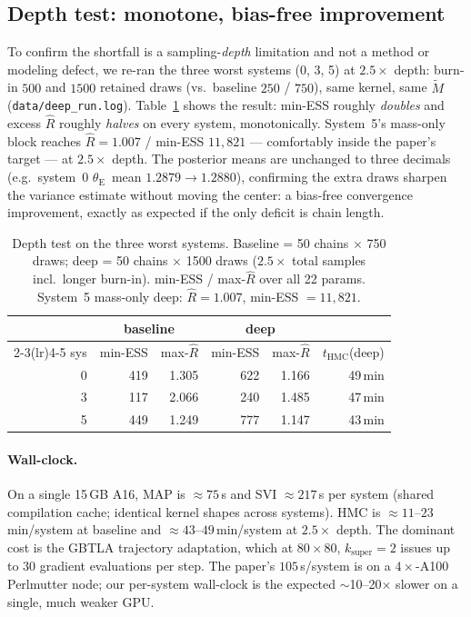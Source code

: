 \documentclass[11pt,letterpaper]{article}
\newcommand{\thetaE}{\ensuremath{\theta_{\mathrm{E}}}}
\newcommand{\Rhat}{\ensuremath{\hat{R}}}
\begin{document}
\subsection{Depth test: monotone, bias-free improvement}

To confirm the shortfall is a sampling-\emph{depth} limitation and not a
method or modeling defect, we re-ran the three worst systems (0, 3, 5) at
$2.5\times$ depth: burn-in $500$ and $1500$ retained draws (vs.\ baseline
$250$ / $750$), same kernel, same $\tilde{M}$
(\texttt{data/deep\_run.log}). Table~\ref{tab:depth} shows the result:
min-ESS roughly \emph{doubles} and excess $\Rhat$ roughly \emph{halves} on
every system, monotonically. System~5's mass-only block reaches
$\Rhat=1.007$ / min-ESS $11{,}821$ --- comfortably inside the paper's
target --- at $2.5\times$ depth. The posterior means are unchanged to three
decimals (e.g.\ system~0 \thetaE\ mean $1.2879\to1.2880$), confirming the
extra draws sharpen the variance estimate without moving the center: a
bias-free convergence improvement, exactly as expected if the only deficit
is chain length.

\begin{table}[ht]
\centering
\caption{Depth test on the three worst systems. Baseline = 50 chains
$\times$ 750 draws; deep = 50 chains $\times$ 1500 draws ($2.5\times$ total
samples incl.\ longer burn-in). min-ESS / max-$\Rhat$ over all 22 params.
System~5 mass-only deep: $\Rhat=1.007$, min-ESS $=11{,}821$.}
\label{tab:depth}
\begin{tabular}{rrrrrr}
\toprule
 & \multicolumn{2}{c}{baseline} & \multicolumn{2}{c}{deep} & \\
\cmidrule(lr){2-3}\cmidrule(lr){4-5}
sys & min-ESS & max-$\Rhat$ & min-ESS & max-$\Rhat$ & $t_{\mathrm{HMC}}$(deep) \\
\midrule
0 & 419 & 1.305 & 622 & 1.166 & 49\,min \\
3 & 117 & 2.066 & 240 & 1.485 & 47\,min \\
5 & 449 & 1.249 & 777 & 1.147 & 43\,min \\
\bottomrule
\end{tabular}
\end{table}

\paragraph{Wall-clock.} On a single 15\,GB A16, MAP is $\approx75$\,s and SVI
$\approx217$\,s per system (shared compilation cache; identical kernel shapes
across systems). HMC is $\approx11$--$23$\,min/system at baseline and
$\approx43$--$49$\,min/system at $2.5\times$ depth. The dominant cost is the
GBTLA trajectory adaptation, which at $80\times80$, $k_{\mathrm{super}}=2$
issues up to $30$ gradient evaluations per step. The paper's $105$\,s/system
is on a $4\times$-A100 Perlmutter node; our per-system wall-clock is the
expected $\sim$10--20$\times$ slower on a single, much weaker GPU.
\end{document}
